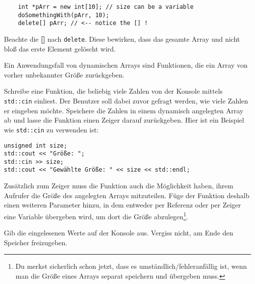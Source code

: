 \begin{lstlisting}
	int *pArr = new int[10]; // size can be a variable
	doSomethingWith(pArr, 10);
	delete[] pArr; // <-- notice the [] !
\end{lstlisting}

Beachte die \textbf{[]} nach \texttt{delete}.
Diese bewirken, dass das gesamte Array und nicht bloß das erste Element gelöscht wird.

Ein Anwendungsfall von dynamischen Arrays sind Funktionen, die ein Array von vorher unbekannter Größe zurückgeben.

Schreibe eine Funktion, die beliebig viele Zahlen von der Konsole mittels \texttt{std::cin} einliest.
Der Benutzer soll dabei zuvor gefragt werden, wie viele Zahlen er eingeben möchte.
Speichere die Zahlen in einem dynamisch angelegten Array ab und lasse die Funktion einen Zeiger darauf zurückgeben.
Hier ist ein Beispiel wie \texttt{std::cin} zu verwenden ist:

\begin{lstlisting}
unsigned int size;
std::cout << "Größe: ";
std::cin >> size;
std::cout << "Gewählte Größe: " << size << std::endl;
\end{lstlisting}

Zusätzlich zum Zeiger muss die Funktion auch die Möglichkeit haben, ihrem Aufrufer die Größe des angelegten Arrays mitzuteilen.
Füge der Funktion deshalb einen weiteren Parameter hinzu, in dem entweder per Referenz oder per Zeiger eine Variable übergeben wird, um dort die Größe abzulegen\footnote{Du merkst sicherlich schon jetzt, dass es umständlich/fehleranfällig ist, wenn man die Größe eines Arrays separat speichern und übergeben muss.}.

Gib die eingelesenen Werte auf der Konsole aus.
Vergiss nicht, am Ende den Speicher freizugeben.
